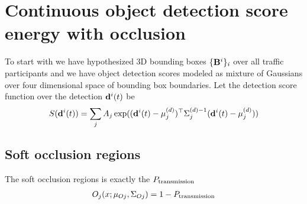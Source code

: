 \documentclass[10pt,twocolumn,letterpaper]{article}
\begin{document}
\section{Continuous object detection score energy with occlusion} 

To start with we have hypothesized 3D bounding boxes $\{ \mathbf{B}^{i} \}_i$
over all traffic participants and we have object detection scores modeled as
mixture of Gaussians over four dimensional space of bounding box boundaries.
Let the detection score function over the detection $\mathbf{d}^{i}(t)$ be 
%
\begin{align}
  S(\mathbf{d}^{i}(t)) = \sum_j A_j \exp((\mathbf{d}^{i}(t)-\mu^{(d)}_j)^\top \Sigma^{(d)-1}_j
  (\mathbf{d}^{i}(t)-\mu^{(d)}_j))
\end{align}
%

\subsection{Soft occlusion regions}
The soft occlusion regions is exactly the $P_{\text{transmission}}$
%
\begin{align}
  O_{j}(x; \mu_{Oj}, \Sigma_{Oj}) = 1 - P_{\text{transmission}}
\end{align}
%
\end{document}
